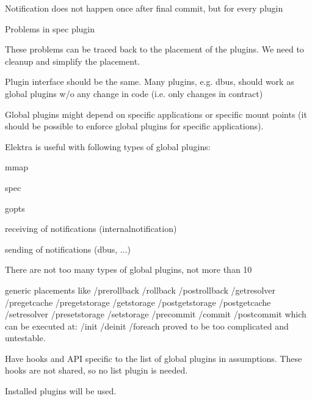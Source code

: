 
\begin{DoxyItemize}
\item Notification does not happen once after final commit, but for every plugin
\item Problems in spec plugin
\end{DoxyItemize}

These problems can be traced back to the placement of the plugins. We need to cleanup and simplify the placement.


\begin{DoxyItemize}
\item Plugin interface should be the same. Many plugins, e.\+g. dbus, should work as global plugins w/o any change in code (i.\+e. only changes in contract)
\item Global plugins might depend on specific applications or specific mount points (it should be possible to enforce global plugins for specific applications).
\end{DoxyItemize}


\begin{DoxyItemize}
\item Elektra is useful with following types of global plugins\+:
\begin{DoxyItemize}
\item mmap
\item spec
\item gopts
\item receiving of notifications (internalnotification)
\item sending of notifications (dbus, ...)
\end{DoxyItemize}
\item There are not too many types of global plugins, not more than 10
\end{DoxyItemize}


\begin{DoxyItemize}
\item generic placements like /prerollback /rollback /postrollback /getresolver /pregetcache /pregetstorage /getstorage /postgetstorage /postgetcache /setresolver /presetstorage /setstorage /precommit /commit /postcommit which can be executed at\+: /init /deinit /foreach proved to be too complicated and untestable.
\end{DoxyItemize}

Have hooks and A\+PI specific to the list of global plugins in assumptions. These hooks are not shared, so no {\ttfamily list} plugin is needed.

Installed plugins will be used.


